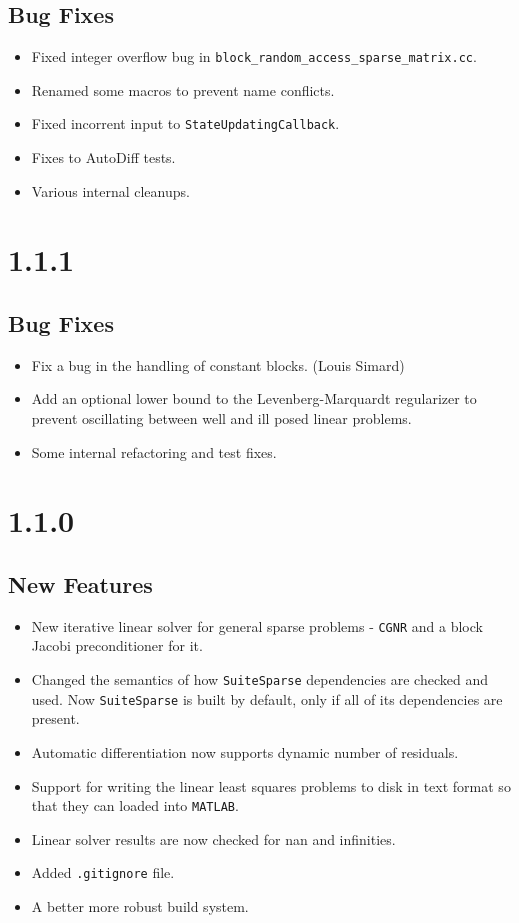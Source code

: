 \subsection{Bug Fixes}
\begin{itemize}
\item Fixed integer overflow bug in \texttt{block\_random\_access\_sparse\_matrix.cc}.
\item Renamed some macros to prevent name conflicts.
\item Fixed incorrent input to \texttt{StateUpdatingCallback}.
\item Fixes to AutoDiff tests.
\item Various internal cleanups.
\end{itemize}

\section*{1.1.1}
\subsection{Bug Fixes}
\begin{itemize}
\item Fix a bug in the handling of constant blocks. (Louis Simard)
\item Add an optional lower bound to the Levenberg-Marquardt regularizer to prevent oscillating between well and ill posed linear problems.
\item Some internal refactoring and test fixes.
\end{itemize}
\section{1.1.0}
\subsection{New Features}
\begin{itemize}
\item New iterative linear solver for general sparse problems - \texttt{CGNR} and a block Jacobi preconditioner for it.
\item Changed the semantics of how \texttt{SuiteSparse} dependencies are checked and used. Now \texttt{SuiteSparse} is built by default, only if all of its dependencies are present.
\item Automatic differentiation now supports dynamic number of residuals.
\item Support for writing the linear least squares problems to disk in text format so that they can loaded into \texttt{MATLAB}.
\item Linear solver results are now checked for nan and infinities.
\item Added \texttt{.gitignore} file.
\item A better more robust build system.
\end{itemize}

